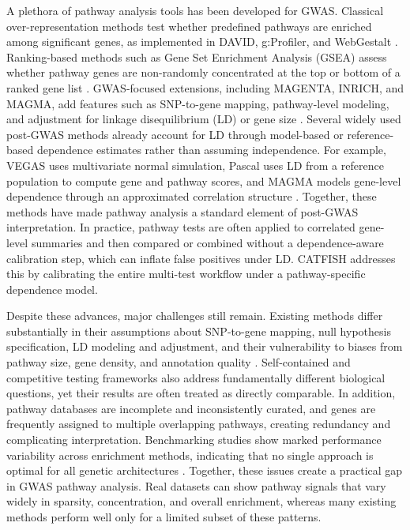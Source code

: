 \documentclass[unnumsec,webpdf,contemporary,large]{oup-authoring-template}%
\theoremstyle{thmstyleone}%
\theoremstyle{thmstyletwo}%
\theoremstyle{thmstylethree}%
\begin{document}
A plethora of pathway analysis tools has been developed for GWAS. Classical over-representation methods test whether predefined pathways are enriched among significant genes, as implemented in DAVID, g:Profiler, and WebGestalt \citep{Sherman2022,Kolberg2023,Liao2019}. Ranking-based methods such as Gene Set Enrichment Analysis (GSEA) assess whether pathway genes are non-randomly concentrated at the top or bottom of a ranked gene list \citep{Subramanian2005}. GWAS-focused extensions, including MAGENTA, INRICH, and MAGMA, add features such as SNP-to-gene mapping, pathway-level modeling, and adjustment for linkage disequilibrium (LD) or gene size \citep{Segre2010,Lee2012,deLeeuw2015}. Several widely used post-GWAS methods already account for LD through model-based or reference-based dependence estimates rather than assuming independence. For example, VEGAS uses multivariate normal simulation, Pascal uses LD from a reference population to compute gene and pathway scores, and MAGMA models gene-level dependence through an approximated correlation structure \citep{Liu2010,deLeeuw2015,Lamparter2016,Watanabe2017}. Together, these methods have made pathway analysis a standard element of post-GWAS interpretation. In practice, pathway tests are often applied to correlated gene-level summaries and then compared or combined without a dependence-aware calibration step, which can inflate false positives under LD. CATFISH addresses this by calibrating the entire multi-test workflow under a pathway-specific dependence model.

Despite these advances, major challenges still remain. Existing methods differ substantially in their assumptions about SNP-to-gene mapping, null hypothesis specification, LD modeling and adjustment, and their vulnerability to biases from pathway size, gene density, and annotation quality \citep{Mooney2015,Debrabant2017}. Self-contained and competitive testing frameworks also address fundamentally different biological questions, yet their results are often treated as directly comparable. In addition, pathway databases are incomplete and inconsistently curated, and genes are frequently assigned to multiple overlapping pathways, creating redundancy and complicating interpretation. Benchmarking studies show marked performance variability across enrichment methods, indicating that no single approach is optimal for all genetic architectures \citep{Geistlinger2021}. Together, these issues create a practical gap in GWAS pathway analysis. Real datasets can show pathway signals that vary widely in sparsity, concentration, and overall enrichment, whereas many existing methods perform well only for a limited subset of these patterns.
\end{document}
